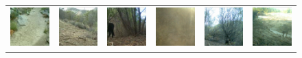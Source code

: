 \begin{figure}[htp!]
\begin{tabularx}{.8\textwidth}{Y Y Y !{\hspace{.05\textwidth}} Y Y Y}
        \includegraphics{gfx/unconditional-diffusion-sampling-caltech-qual/rgb_5858c0dc-23d2-11e8-a6a3-ec086b02610b.jpg} & \includegraphics{gfx/unconditional-diffusion-sampling-caltech-qual/rgb_585a640e-23d2-11e8-a6a3-ec086b02610b.jpg} & \includegraphics{gfx/unconditional-diffusion-sampling-caltech-qual/rgb_585a6486-23d2-11e8-a6a3-ec086b02610b.jpg} & \includegraphics{gfx/unconditional-diffusion-sampling-caltech-qual/diffusion_00002.png} & \includegraphics{gfx/unconditional-diffusion-sampling-caltech-qual/diffusion_00001.png} & \includegraphics{gfx/unconditional-diffusion-sampling-caltech-qual/diffusion_00000.png} \\

\end{tabularx}
\end{figure}
